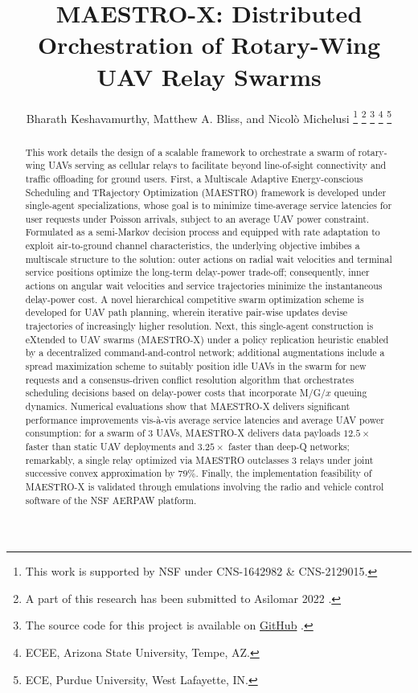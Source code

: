 \documentclass[10pt, twocolumn]{IEEEtran}
\title{MAESTRO-X: Distributed Orchestration of Rotary-Wing UAV Relay Swarms}
\author{Bharath Keshavamurthy\IEEEauthorrefmark{1}, Matthew A. Bliss\IEEEauthorrefmark{2}, and Nicol\`{o} Michelusi\IEEEauthorrefmark{1}
\thanks{This work is supported by NSF under CNS-1642982 \& CNS-2129015.}
\thanks{A part of this research has been submitted to Asilomar 2022 \cite{ASILOMAR}.}
\thanks{The source code for this project is available on \href{https://github.com/bharathkeshavamurthy/MAESTRO-X.git}{GitHub} \cite{MAESTRO-X}.}
\thanks{\IEEEauthorrefmark{1}ECEE, Arizona State University, Tempe, AZ.}
\thanks{\IEEEauthorrefmark{2}ECE, Purdue University, West Lafayette, IN.}
\vspace{-10mm}
}
\theoremstyle{plain}
\theoremstyle{definition}
\theoremstyle{remark}
\begin{document}

\maketitle
\thispagestyle{empty}
\pagestyle{empty}
\vspace{-20mm}


\begin{abstract}

This work details the design of a scalable framework to orchestrate a swarm of rotary-wing UAVs serving as cellular relays to facilitate beyond line-of-sight connectivity and traffic offloading for ground users. First, a Multiscale Adaptive Energy-conscious Scheduling and TRajectory Optimization (MAESTRO) framework is developed under single-agent specializations, whose goal is to minimize time-average service latencies for user requests under Poisson arrivals, subject to an average UAV power constraint. Formulated as a semi-Markov decision process and equipped with rate adaptation to exploit air-to-ground channel characteristics, the underlying objective imbibes a multiscale structure to the solution: outer actions on radial wait velocities and terminal service positions optimize the long-term delay-power trade-off; consequently, inner actions on angular wait velocities and service trajectories minimize the instantaneous delay-power cost. A novel hierarchical competitive swarm optimization scheme is developed for UAV path planning, wherein iterative pair-wise updates devise trajectories of increasingly higher resolution. Next, this single-agent construction is eXtended to UAV swarms (MAESTRO-X) under a policy replication heuristic enabled by a decentralized command-and-control network; additional augmentations include a spread maximization scheme to suitably position idle UAVs in the swarm for new requests and a consensus-driven conflict resolution algorithm that orchestrates scheduling decisions based on delay-power costs that incorporate M/G/$x$ queuing dynamics. Numerical evaluations show that MAESTRO-X delivers significant performance improvements vis-à-vis average service latencies and average UAV power consumption: for a swarm of $3$ UAVs, MAESTRO-X delivers  data payloads $12.5\times$ faster than static UAV deployments and $3.25\times$ faster than deep-Q networks; remarkably, a single relay optimized via MAESTRO outclasses $3$ relays under joint successive convex approximation by $79$\%. Finally, the implementation feasibility of MAESTRO-X is validated through emulations involving the radio and vehicle control software of the NSF AERPAW platform.

\end{abstract}
\end{document}
